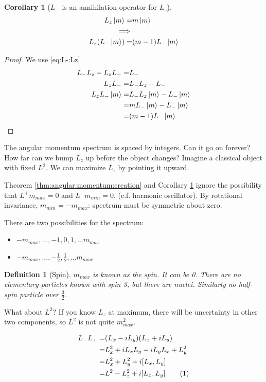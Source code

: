 \documentclass[]{article}
\newcommand\numberthis{\addtocounter{equation}{1}\tag{\theequation}}
\newtheorem{defn}[thm]{Definition}
\newtheorem{cor}[thm]{Corollary}
\begin{document}
\begin{cor}[$L_-$ is an annihilation  operator for $L_z$]\label{thm:angular:momentum:annihilation}
	\begin{align*}
	L_z \ket{m} =& m \ket{m} \\
	\implies&\\
	L_z (L_- \ket{m}) =& (m-1) L_- \ket{m}
	\end{align*}	
\end{cor}
\begin{proof}
	We use \eqref{eq:L-:Lz}
	\begin{align*}
		L_-L_z - L_zL_-=&L_- \\
		L_zL_- =& L_-L_z - L_- \\
		L_zL_-\ket{m} =& L_-L_z\ket{m} - L_-\ket{m}\\
		=& m L_-\ket{m} - L_-\ket{m}\\
		 =& (m-1) L_- \ket{m}
	\end{align*}
\end{proof}
The angular momentum spectrum is spaced by integers. Can it go on forever? How far can we bump $L_z$ up before the object changes? Imagine a classical object with fixed $L^2$. We can maximize $L_z$  by pointing it upward.

Theorem \ref{thm:angular:momentum:creation} and Corollary \ref{thm:angular:momentum:annihilation} ignore the possibility that $L^+m_{max}=0$ and $L^-m_{min}=0$. (c.f. harmonic oscillator). By rotational invariance, $m_{min}=-m_{max}$: spectrum must be symmetric about zero.

There are two possibilities for the spectrum:
\begin{itemize}
	\item $-m_{max},...,-1,0,1,...m_{max}$
	\item $-m_{max},...,-\frac{1}{2},\frac{1}{2},...m_{max}$
\end{itemize}

\begin{defn}[Spin]
	$m_{max}$ is known as the spin. It can be 0. There are no elementary particles known with spin 3, but there are nuclei. Similarly no half-spin particle over $\frac{3}{2}$.
\end{defn}

What about $L^2$? If you know $L_z$ at maximum, there will be uncertainty in other two components, so $L^2$ is not quite $m_{max}^2$.

\begin{align*}
	L_- L_+ =& (L_x-iL_y)(L_x+iL_y)\\
	=& L_x^2 +i L_x L_y -i L_y L_x + L_y^2\\
	=& L_x^2 + L_y^2 + i[L_x,L_y]\\
	=& L^2 - L_z^2 + i[L_x,L_y] \numberthis \label{eq:L-:L+}
\end{align*}
\end{document}
